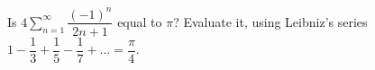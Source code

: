 Is $\displaystyle4\sum_{n=1}^{\infty}\dfrac{(-1)^n}{2n+1}$ equal to $\pi$? Evaluate it, using Leibniz's series $1-\dfrac13+\dfrac15-\dfrac17+\dots=\dfrac\pi4$.
